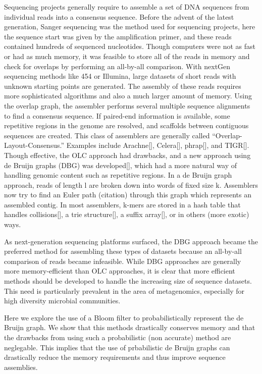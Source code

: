 \documentclass[12pt]{article} \usepackage{simplemargins}
\begin{document}
Sequencing projects generally require to assemble a set of DNA
sequences from individual reads into a consensus sequence. Before the
advent of the latest generation, Sanger sequencing was the method used
for sequencing projects, here the sequence start was given by the
amplification primer, and these reads contained hundreds of sequenced
nucleotides. Though computers were not as fast or had as much memory,
it was feasible to store all of the reads in memory and check for
overlaps by performing an all-by-all comparison. With nextGen
sequencing methods like 454 or Illumina, large datasets of short reads
with unknown starting points are generated. The assembly of these
reads requires more sophisticated algorithms and also a much larger
amount of memory. Using the overlap graph, the assembler performs
several multiple sequence alignments to find a consensus sequence. If
paired-end information is available, some repetitive regions in the
genome are resolved, and scaffolds between contiguous sequences are
created. This class of assemblers are generally called
“Overlap-Layout-Consensus.” Examples include Arachne[], Celera[],
phrap[], and TIGR[]. Though effective, the OLC approach had drawbacks,
and a new approach using de Bruijn graphs (DBG) was developed[], which
had a more natural way of handling genomic content such as repetitive
regions. In a de Bruijn graph approach, reads of length l are broken
down into words of fixed size k. Assemblers now try to find an Euler
path (citation) through this graph which represents an assembled
contig. In most assemblers, k-mers are stored in a hash table that
handles collisions[], a trie structure[], a suffix array[], or in
others (more exotic) ways.

As next-generation sequencing platforms surfaced, the DBG approach
became the preferred method for assembling these types of datasets
because an all-by-all comparison of reads became infeasible. While DBG
approaches are generally more memory-efficient than OLC approaches, it
is clear that more efficient methods should be developed to handle the
increasing size of sequence datasets. This need is particularly
prevalent in the area of metagenomics, especially for high diversity
microbial communities.

Here we explore the use of a Bloom filter to probabilistically
represent the de Bruijn graph. We show that this methods drastically
conserves memory and that the drawbacks from using such a
probabilistic (non accurate) method are neglegable. This implies that
the use of prbabilistic de Bruijn graphs can drastically reduce the
memory requirements and thus improve sequence assemblies.
\end{document}

